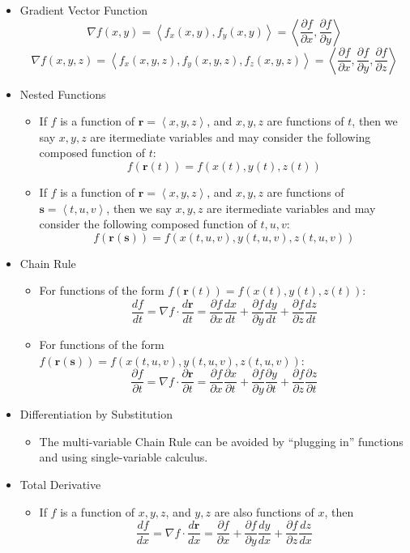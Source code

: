 \documentclass[12pt]{article}
\renewcommand{\vec}[1]{\mathbf{#1}}
\newcommand{\<}{\left<}
\renewcommand{\>}{\right>}
\newcommand{\p}{\partial}
\begin{document}
\begin{itemize}

  \item Gradient Vector Function
    \[\nabla f(x,y) = \< f_x(x,y),f_y(x,y) \> = \<\frac{\p f}{\p x}, \frac{\p f}{\p y}\>\]
    \[\nabla f(x,y,z) = \< f_x(x,y,z),f_y(x,y,z),f_z(x,y,z) \> = \<\frac{\p f}{\p x}, \frac{\p f}{\p y}, \frac{\p f}{\p z}\>\]

  \item Nested Functions
    \begin{itemize}
      \item If $f$ is a function of $\vec{r}=\<x,y,z\>$, and $x,y,z$ are functions of $t$, then we say $x,y,z$ are itermediate variables and may consider the following composed function of $t$:
        \[f(\vec{r}(t))=f(x(t),y(t),z(t))\]
      \item If $f$ is a function of $\vec{r}=\<x,y,z\>$, and $x,y,z$ are functions of $\vec{s}=\<t,u,v\>$, then we say $x,y,z$ are itermediate variables and may consider the following composed function of $t,u,v$:
        \[f(\vec{r}(\vec{s}))=f(x(t,u,v),y(t,u,v),z(t,u,v))\]
    \end{itemize}
  
  \item Chain Rule
    \begin{itemize}
      \item For functions of the form $f(\vec{r}(t))=f(x(t),y(t),z(t))$:
        \[
          \frac{df}{dt}=\nabla{f}\cdot\frac{d\vec{r}}{dt}=\frac{\p f}{\p x}\frac{dx}{dt}+\frac{\p f}{\p y}\frac{dy}{dt}+\frac{\p f}{\p z}\frac{dz}{dt}
        \]
      \item For functions of the form $f(\vec{r}(\vec{s}))=f(x(t,u,v),y(t,u,v),z(t,u,v))$:
        \[
          \frac{\p f}{\p t}=\nabla{f}\cdot\frac{\p\vec{r}}{\p t}=\frac{\p f}{\p x}\frac{\p x}{\p t}+\frac{\p f}{\p y}\frac{\p y}{\p t}+\frac{\p f}{\p z}\frac{\p z}{\p t}
        \]
    \end{itemize}
    
  \item Differentiation by Substitution
  
    \begin{itemize}
    \item The multi-variable Chain Rule can be avoided by ``plugging in'' functions and using single-variable calculus.
    \end{itemize}

  \newpage

  \item Total Derivative
    \begin{itemize}
    \item If $f$ is a function of $x,y,z$, and $y,z$ are also functions of $x$, then
      \[
        \frac{df}{dx} = \nabla f \cdot \frac{d\vec{r}}{dx} = 
        \frac{\partial f}{\partial x} + \frac{\partial f}{\partial y}\frac{dy}{dx} + \frac{\partial f}{\partial z}\frac{dz}{dx} 
      \]
    \end{itemize}
    

\end{itemize}
\end{document}
